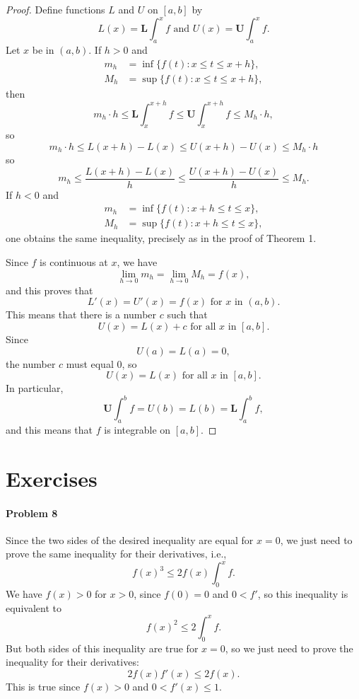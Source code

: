 \documentclass{article}
\begin{document}
\begin{proof}
  Define functions $L$ and $U$ on $[a, b]$ by \[
    L(x) = \textbf{L}\int_a^x f \text{ and } U(x) = \textbf{U}\int_a^x f.
  \] Let $x$ be in $(a, b)$. If $h > 0$ and
  \begin{align*}
    m_h &= \inf\{f(t): x \leq t \leq x + h\}, \\
    M_h &= \sup\{f(t): x \leq t \leq x + h\},
  \end{align*}
  then \[
    m_h \cdot h \leq \textbf{L}\int_x^{x + h} f \leq \textbf{U}\int_x^{x + h} f
    \leq M_h \cdot h,
  \] so \[
    m_h \cdot h \leq L(x + h) - L(x) \leq U(x + h) - U(x) \leq M_h \cdot h
  \] so \[
    m_h \leq \frac{L(x + h) - L(x)}{h} \leq \frac{U(x + h) - U(x)}{h} \leq M_h.
  \] If $h < 0$ and
  \begin{align*}
    m_h &= \inf\{f(t): x + h \leq t \leq x\}, \\
    M_h &= \sup\{f(t): x + h \leq t \leq x\},
  \end{align*}
  one obtains the same inequality, precisely as in the proof of
  Theorem 1.

  Since $f$ is continuous at $x$, we have \[
    \lim_{h \to 0} m_h = \lim_{h \to 0} M_h = f(x),
  \] and this proves that \[
    L'(x) = U'(x) = f(x) \text{ for } x \text{ in } (a, b).
  \] This means that there is a number $c$ such that \[
    U(x) = L(x) + c \text{ for all } x \text{ in } [a, b].
  \] Since \[
    U(a) = L(a) = 0,
  \] the number $c$ must equal 0, so \[
    U(x) = L(x) \text{ for all } x \text{ in } [a, b].
  \] In particular, \[
    \textbf{U}\int_a^b f = U(b) = L(b) = \textbf{L}\int_a^b f,
  \] and this means that $f$ is integrable on $[a, b]$.
\end{proof}

\section*{Exercises}

\paragraph{Problem 8} Since the two sides of the desired inequality are equal
for $x = 0$, we just need to prove the same inequality for their derivatives,
i.e., \[
  f(x)^3 \leq 2f(x)\int_0^x f.
\] We have $f(x) > 0$ for $x > 0$, since $f(0) = 0$ and $0 < f'$, so this
inequality is equivalent to \[
  f(x)^2 \leq 2\int_0^x f.
\] But both sides of this inequality are true for $x = 0$, so we just need to
prove the inequality for their derivatives: \[
  2f(x)f'(x) \leq 2f(x).
\] This is true since $f(x) > 0$ and $0 < f'(x) \leq 1$.
\end{document}
